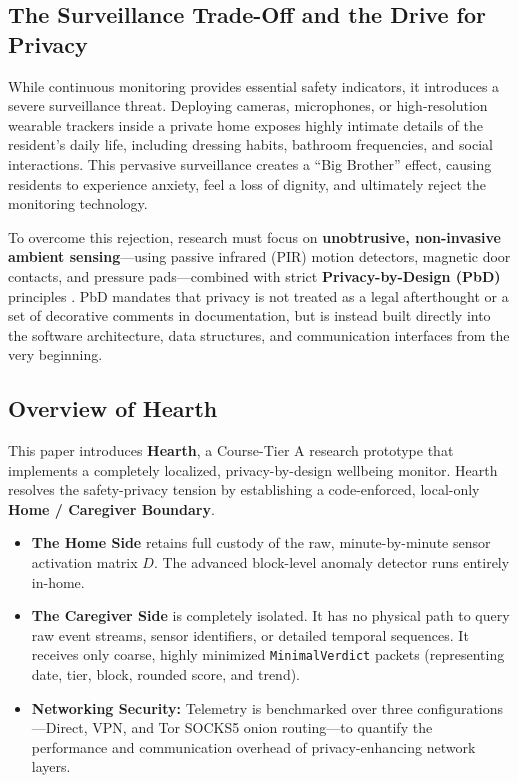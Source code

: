 \documentclass[conference]{IEEEtran}
\begin{document}
\subsection{The Surveillance Trade-Off and the Drive for Privacy}
While continuous monitoring provides essential safety indicators, it introduces a severe surveillance threat. Deploying cameras, microphones, or high-resolution wearable trackers inside a private home exposes highly intimate details of the resident's daily life, including dressing habits, bathroom frequencies, and social interactions. This pervasive surveillance creates a ``Big Brother'' effect, causing residents to experience anxiety, feel a loss of dignity, and ultimately reject the monitoring technology.

To overcome this rejection, research must focus on \textbf{unobtrusive, non-invasive ambient sensing}---using passive infrared (PIR) motion detectors, magnetic door contacts, and pressure pads---combined with strict \textbf{Privacy-by-Design (PbD)} principles \cite{chandola survey, intille future}. PbD mandates that privacy is not treated as a legal afterthought or a set of decorative comments in documentation, but is instead built directly into the software architecture, data structures, and communication interfaces from the very beginning.

\subsection{Overview of Hearth}
This paper introduces \textbf{Hearth}, a Course-Tier A research prototype that implements a completely localized, privacy-by-design wellbeing monitor. Hearth resolves the safety-privacy tension by establishing a code-enforced, local-only \textbf{Home / Caregiver Boundary}.
\begin{itemize}
  \item \textbf{The Home Side} retains full custody of the raw, minute-by-minute sensor activation matrix $D$. The advanced block-level anomaly detector runs entirely in-home.
  \item \textbf{The Caregiver Side} is completely isolated. It has no physical path to query raw event streams, sensor identifiers, or detailed temporal sequences. It receives only coarse, highly minimized \texttt{MinimalVerdict} packets (representing date, tier, block, rounded score, and trend).
  \item \textbf{Networking Security:} Telemetry is benchmarked over three configurations---Direct, VPN, and Tor SOCKS5 onion routing---to quantify the performance and communication overhead of privacy-enhancing network layers.
\end{itemize}
\end{document}
